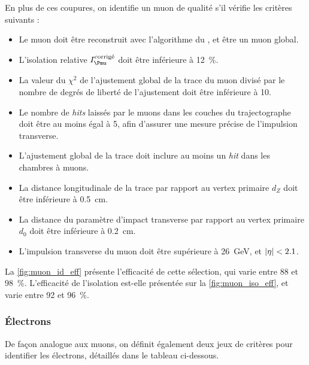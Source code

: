 En plus de ces coupures, on identifie un muon de qualité s'il vérifie les critères suivants :
\begin{itemize}
  \item Le muon doit être reconstruit avec l'algorithme du \pf, et être un muon global.
  \item L'isolation relative $I_{\Pmu}^\text{corrigé}$ doit être inférieure à \SI{12}{\%}.
  \item La valeur du $\chi^2$ de l'ajustement global de la trace du muon divisé par le nombre de degrés de liberté de l'ajustement doit être inférieure à \num{10}.
  \item Le nombre de \emph{hits} laissés par le muons dans les couches du trajectographe doit être au moins égal à 5, afin d'assurer une mesure précise de l'impulsion transverse.
  \item L'ajustement global de la trace doit inclure au moins un \emph{hit} dans les chambres à muons.
  \item La distance longitudinale de la trace par rapport au vertex primaire $d_Z$ doit être inférieure à \SI{0.5}{\cm}.
  \item La distance du paramètre d'impact transverse par rapport au vertex primaire $d_0$ doit être inférieure à \SI{0.2}{\cm}.
  \item L'impulsion transverse du muon doit être supérieure à \SI{26}{\GeV}, et $\lvert \eta \rvert < \num{2.1}$.
\end{itemize}

La \cref{fig:muon_id_eff} présente l'efficacité de cette sélection, qui varie entre \num{88} et \SI{98}{\%}. L'efficacité de l'isolation est-elle présentée sur la \cref{fig:muon_iso_eff}, et varie entre \num{92} et \SI{96}{\%}.

\subsubsection{Électrons} \label{sec:sel_electron}

De façon analogue aux muons, on définit également deux jeux de critères pour identifier les électrons, détaillés dans le tableau ci-dessous.

